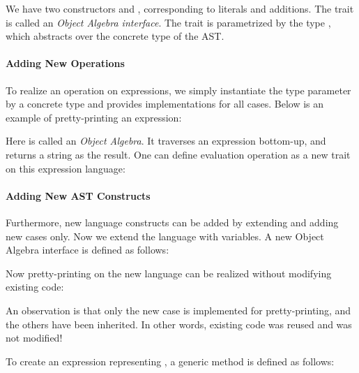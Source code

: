 We have two constructors  and , corresponding to literals and additions. The trait  is called an \textit{Object Algebra interface}. The trait is parametrized by the type
, which abstracts over the concrete type of the AST.

\paragraph{Adding New Operations}
To realize an operation on expressions, we simply instantiate the type parameter by a concrete type and
provides implementations for all cases. Below is an example of pretty-printing an expression:

Here  is called an \textit{Object Algebra}. It traverses an expression bottom-up, and returns a string as the result.
One can define evaluation operation as a new trait on this expression language:


\paragraph{Adding New AST Constructs}
Furthermore, new language constructs can be added by extending  and adding new cases only. Now we extend the language
with variables. A new Object Algebra interface  is defined as follows:

Now pretty-printing on the new language can be realized without modifying existing code:

An observation is that only the new case is implemented for pretty-printing, and the others have been inherited.
In other words, existing code was reused and was not modified!

To create an expression representing , a generic method is defined as follows:

